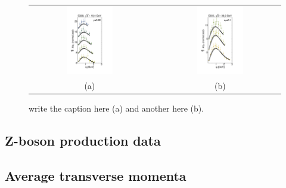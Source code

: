 \documentclass[aps,preprintnumbers,showpacs,nofootinbib,superscriptaddress,floatfix]{revtex4}
\begin{document}
\begin{figure}[h!]
\centering
\begin{tabular}{ccc}
\includegraphics[width=0.40\textwidth]{plots/DY-Z/DY_SCIplot_flINDEP_3.pdf}
&\hspace{0.001cm}
&
\includegraphics[width=0.40\textwidth]{plots/DY-Z/DY_SCIplot_flINDEP_4.pdf}
\\
(a) && (b)
\end{tabular}
\caption{write the caption here (a) and another here (b).}
\label{f:DY_panel_2}
\end{figure}



\subsection{Z-boson production data}
\label{ss:zboson}


\subsection{Average transverse momenta}
\label{ss:kT2_PT2}
\end{document}
